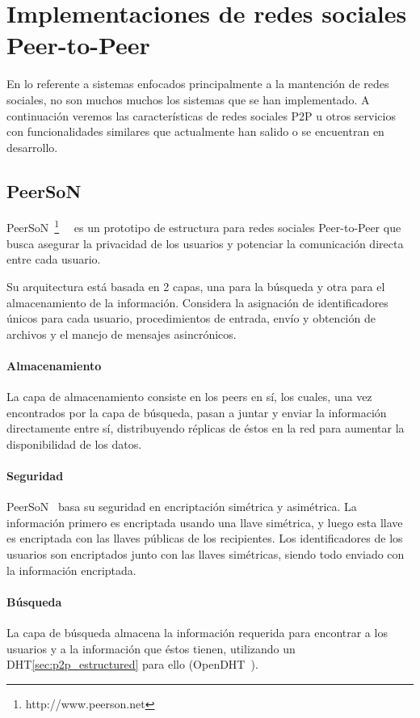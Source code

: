 

\section{Implementaciones de redes sociales Peer-to-Peer}
\label{sec:implementaciones}

En lo referente a sistemas enfocados principalmente a la mantención de redes
sociales, no son muchos muchos los sistemas que se han implementado. A
continuación veremos las características de redes sociales P2P u otros
servicios con funcionalidades similares que actualmente han salido o se encuentran en desarrollo.

\subsection{PeerSoN}
PeerSoN~\footnote{http://www.peerson.net}~\cite{buchegger:peerson}~\cite{buchegger:2009:pps:1578002.1578010}  es un prototipo de estructura para redes sociales
Peer-to-Peer que busca asegurar la privacidad de los usuarios y potenciar la
comunicación directa entre cada usuario.

Su arquitectura está basada en 2 capas, una para la búsqueda y otra para el almacenamiento de la
información. Considera la asignación de identificadores únicos para cada
usuario, procedimientos de entrada, envío y obtención de archivos y el manejo
de mensajes asincrónicos.

\paragraph{Almacenamiento}
La capa de almacenamiento consiste en los peers en sí, los cuales, una vez
encontrados por la capa de búsqueda, pasan a juntar y enviar la información
directamente entre sí, distribuyendo réplicas de éstos
en la red para aumentar la disponibilidad de los datos. 

\paragraph{Seguridad}
PeerSoN~\cite{buchegger:peerson} basa su seguridad en encriptación simétrica y asimétrica. La
información primero es encriptada usando una llave simétrica, y luego esta
llave es encriptada con las llaves públicas de los recipientes. Los
identificadores de los usuarios son encriptados junto con las llaves
simétricas, siendo todo enviado con la información encriptada.

\paragraph{Búsqueda}
 La capa de búsqueda almacena la información requerida para
encontrar a los usuarios y a la información que éstos tienen, utilizando un
DHT\ref{sec:p2p_estructured} para ello (OpenDHT~\cite{Rhea:2005:OPD:1080091.1080102}).

